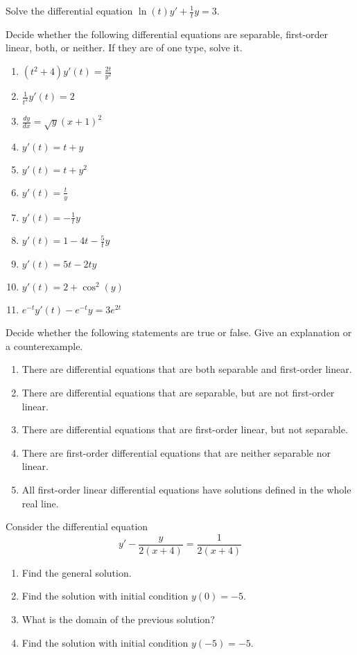 \begin{exercises}

	\begin{problist}
	\prob Solve the differential equation $\displaystyle \ln(t) y' + \frac{1}{t}y = 3$.
	
	\prob Decide whether the following differential equations are separable, first-order linear, both, or neither. If they are of one type, solve it.
	\begin{enumerate}
		\item $\displaystyle (t^2+4) y'(t) = \frac{2t}{y^2}$
		\item $\displaystyle \frac{1}{t^2} y'(t) = 2$
		\item $\displaystyle \frac{dy}{dx} = \sqrt{y} (x+1)^2$
		\item $\displaystyle y'(t) = t + y$
		\item $\displaystyle y'(t) = t + y^2$
		\item $\displaystyle y'(t) = \frac{t}{y}$
		\item $\displaystyle y'(t) = -\frac{1}{t} y$
		\item $\displaystyle y'(t) = 1 - 4t - \frac5t y$
		\item $\displaystyle y'(t) = 5t - 2t y$
		\item $\displaystyle y'(t) = 2 + \cos^2(y)$
		\item $\displaystyle e^{-t} y'(t) - e^{-t} y = 3e^{2t}$
	\end{enumerate}
	
	\prob Decide whether the following statements are true or false. Give an explanation or a counterexample.
	
	\begin{enumerate}
		\item There are differential equations that are both separable and first-order linear.
		\item There are differential equations that are separable, but are not first-order linear.
		\item There are differential equations that are first-order linear, but not separable.
		\item There are first-order differential equations that are neither separable nor linear.
		\item All first-order linear differential equations have solutions defined in the whole real line.
	\end{enumerate}
	
	
	\prob Consider the differential equation
	$$ y' - \frac{y}{2(x+4)} = \frac{1}{2(x+4)} $$
	\begin{enumerate}
		\item Find the general solution.
		\item Find the solution with initial condition $y(0)=-5$.
		\item What is the domain of the previous solution?
		\item Find the solution with initial condition $y(-5)=-5$.
	\end{enumerate}



\end{problist}
\end{exercises}
